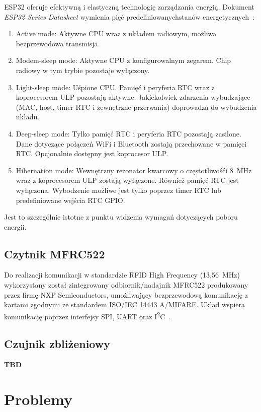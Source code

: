             ESP32 oferuje efektywną i elastyczną technologię zarządzania energią. Dokument \textit{ESP32 Series Datasheet} wymienia pięć predefiniowanychstanów energetycznych~\cite{esp32-ds}:
            \begin{enumerate}
                \item Active mode: Aktywne CPU wraz z układem radiowym, możliwa bezprzewodowa transmisja.
                \item Modem-sleep mode: Aktywne CPU z konfigurowalnym zegarem. Chip radiowy w tym trybie pozostaje wyłączony.
                \item Light-sleep mode: Uśpione CPU. Pamięć i peryferia RTC wraz z koprocesorem ULP pozostają aktywne. Jakiekolwiek zdarzenia wybudzające (MAC, host, timer RTC i zewnętrzne przerwania) doprowadzą do wybudzenia układu.
                \item Deep-sleep mode: Tylko pamięć RTC i peryferia RTC pozostają zasilone. Dane dotyczące połączeń WiFi i Bluetooth zostają przechowane w pamięci RTC. Opcjonalnie dostępny jest koprocesor ULP.
                \item Hibernation mode: Wewnętrzny rezonator kwarcowy o częstotliwośći 8~MHz wraz z koprocesorem ULP zostają wyłączone. Również pamięć RTC jest wyłączona. Wybodzenie możliwe jest tylko poprzez timer RTC lub predefiniowane wejścia RTC GPIO.
            \end{enumerate}
            Jest to szczególnie istotne z punktu widzenia wymagań dotyczących poboru energii.

        \subsection{Czytnik MFRC522}

            Do realizacji komunikacji w standardzie RFID High Frequency (13,56~MHz) wykorzystany został zintegrowany odbiornik/nadajnik MFRC522 produkowany przez firmę NXP Semiconductors, umożliwający bezprzewodową komunikację z kartami zgodnymi ze standardem ISO/IEC 14443 A/MIFARE. Układ wspiera komunikację poprzez interfejsy SPI, UART oraz I\textsuperscript{2}C~\cite{mfrc522-ds}.

        \subsection{Czujnik zbliżeniowy}
            \textbf{TBD}


    \section{Problemy}

